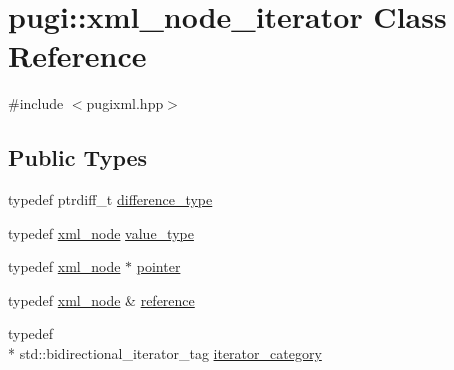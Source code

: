 \hypertarget{classpugi_1_1xml__node__iterator}{\section{pugi\-:\-:xml\-\_\-node\-\_\-iterator Class Reference}
\label{classpugi_1_1xml__node__iterator}
}


{\ttfamily \#include $<$pugixml.\-hpp$>$}

\subsection*{Public Types}
\begin{DoxyCompactItemize}
\item 
typedef ptrdiff\-\_\-t \hyperlink{classpugi_1_1xml__node__iterator_af493930602ec2f56d27c84d148d692ef}{difference\-\_\-type}
\item 
typedef \hyperlink{classpugi_1_1xml__node}{xml\-\_\-node} \hyperlink{classpugi_1_1xml__node__iterator_a2b0d0c1dd1238c23ef07feeb6069393f}{value\-\_\-type}
\item 
typedef \hyperlink{classpugi_1_1xml__node}{xml\-\_\-node} $\ast$ \hyperlink{classpugi_1_1xml__node__iterator_a8e5476d1f854eb64f92f42dac648acf1}{pointer}
\item 
typedef \hyperlink{classpugi_1_1xml__node}{xml\-\_\-node} \& \hyperlink{classpugi_1_1xml__node__iterator_ae2efdeb44673427f99b7cc1e726bfa13}{reference}
\item 
typedef \\*
std\-::bidirectional\-\_\-iterator\-\_\-tag \hyperlink{classpugi_1_1xml__node__iterator_ac65c62a919aa8818f0f1204ef0ab24c1}{iterator\-\_\-category}
\end{DoxyCompactItemize}
